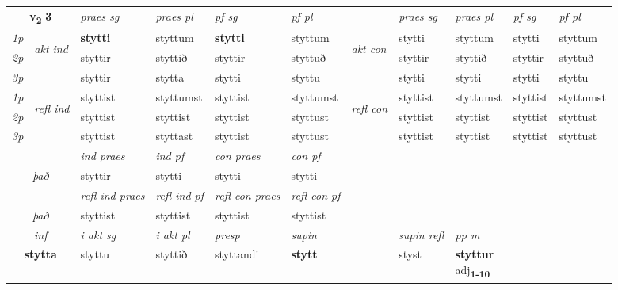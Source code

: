 \noindent
\begin{tabular}{lllllllllll} \toprule
\multicolumn{2}{c}{\textbf{v{\textsubscript{2}}} \Large{\textbf{3}}}  &  \textit{praes sg}  & \textit{praes pl}  &\textit{ pf sg} & \textit{pf pl} &  &  \textit{praes sg}  & \textit{praes pl}  & \textit{pf sg} & \textit{pf pl } \\*
	\cmidrule{3-6} \cmidrule{8-11}
 {\textit{1p}} & \multirow{3}{*}{\begin{turn}{90}\textit{akt ind}\end{turn}} & \textbf{stytti} & styttum & \textbf{stytti} & styttum & \multirow{3}{*}{\begin{turn}{90}\textit{akt con}\end{turn}} &stytti & styttum & stytti & styttum\\*
 {\textit{2p}} &  &  styttir  & styttið & styttir & styttuð & & styttir & styttið & styttir & styttuð \\*
{\textit{3p}} &  & styttir & stytta & stytti & styttu & & stytti & stytti& stytti & styttu \\*
\cmidrule{3-6} \cmidrule{8-11}
 {\textit{1p}} & \multirow{3}{*}{\begin{turn}{90}\textit{refl ind}\end{turn}}  & styttist & styttumst & styttist & styttumst & \multirow{3}{*}{\begin{turn}{90}\textit{refl con}\end{turn}}  &styttist & styttumst & styttist & styttumst \\*
 {\textit{2p}} &  & styttist & styttist & styttist & styttust & &styttist & styttist & styttist & styttust \\*
 {\textit{3p}}  & & styttist & styttast & styttist & styttust & & styttist & styttist& styttist & styttust \\*
\cmidrule{3-6} \cmidrule{8-11}

   & &  \textit{ind praes} & \textit{ind pf} & \textit{con praes} & \textit{con pf} \\*
\multicolumn{2}{c}{ \textit{það} } & styttir & stytti & stytti & stytti \\*

\cmidrule{3-6}
 & & \textit{refl ind praes} & \textit{refl ind pf} & \textit{refl con praes} & \textit{refl con pf} \\*
 \multicolumn{2}{c}{ \textit{það} }& styttist & styttist & styttist & styttist \\*

\cmidrule{3-9}
   \multicolumn{2}{c}{\textit{inf}}  & \textit{i akt sg} & \textit{i akt pl}   & \textit{presp} & \textit{supin} && \textit{supin refl} & \textit{pp m} \\*
  \multicolumn{2}{c}{\textbf{stytta}} & styttu  & styttið   & styttandi &  \textbf{stytt} && styst & \specialcell{\textbf{styttur} \\ adj\textbf{\textsubscript{1-10}}} \\*
\end{tabular}

